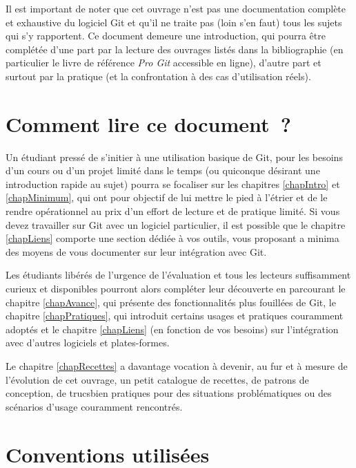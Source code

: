 Il est important de noter que cet ouvrage n'est pas une documentation
complète et exhaustive du logiciel Git et qu'il ne traite pas (loin
s'en faut) tous les sujets qui s'y rapportent. Ce document demeure une
introduction, qui pourra être complétée d'une part par la lecture des
ouvrages listés dans la bibliographie (en particulier le livre de
référence \textit{Pro Git} \cite{ProGit} accessible en ligne), d'autre
part et surtout par la pratique (et la confrontation à des cas
d'utilisation réels).

\section*{Comment lire ce document~?}

Un étudiant pressé de s'initier à une utilisation basique de Git, pour
les besoins d'un cours ou d'un projet limité dans le temps (ou
quiconque désirant une introduction rapide au sujet) pourra se
focaliser sur les chapitres \ref{chapIntro} et \ref{chapMinimum}, qui
ont pour objectif de lui mettre le pied à l'étrier et de le rendre
opérationnel au prix d'un effort de lecture et de pratique limité. Si
vous devez travailler sur Git avec un logiciel particulier, il est
possible que le chapitre \ref{chapLiens} comporte une section dédiée à
vos outils, vous proposant a minima des moyens de vous documenter sur
leur intégration avec Git.

Les étudiants libérés de l'urgence de l'évaluation et tous les
lecteurs suffisamment curieux et disponibles pourront alors compléter
leur découverte en parcourant le chapitre \ref{chapAvance}, qui
présente des fonctionnalités plus fouillées de Git, le chapitre
\ref{chapPratiques}, qui introduit certains usages et pratiques
couramment adoptés et le chapitre \ref{chapLiens} (en fonction de vos
besoins) sur l'intégration avec d'autres logiciels et plates-formes.

Le chapitre \ref{chapRecettes} a davantage vocation à devenir, au fur
et à mesure de l'évolution de cet ouvrage, un petit catalogue de
recettes, de patrons de conception, de \og trucs\fg bien pratiques
pour des situations problématiques ou des scénarios d'usage couramment
rencontrés.

\section*{Conventions utilisées}

